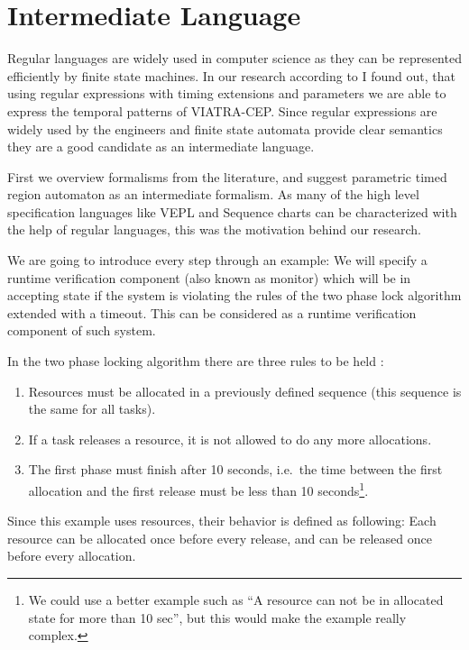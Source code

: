 \chapter{Intermediate Language}
\label{chap:cep}

Regular languages are widely used in computer science as they can be represented efficiently by finite state machines.		
In our research according to \citep{davidi} I found out, that using regular expressions with timing extensions and parameters we are able to express the temporal patterns of VIATRA-CEP.
Since regular expressions are widely used by the engineers and finite state automata provide clear semantics they are a good candidate as an intermediate language.

First we overview formalisms from the literature, and suggest parametric timed region automaton as an intermediate formalism.
As many of the high level specification languages like VEPL and Sequence charts can be characterized with the help of regular languages,
this was the motivation behind our research.%

We are going to introduce every step through an example: 
We will specify a runtime verification component (also known as monitor) which will be in accepting state if the system is violating the rules of the two phase lock algorithm extended with a timeout. 
This can be considered as a runtime verification component of such system.

In the two phase locking algorithm there are three rules to be held :
\begin{enumerate}
	\item Resources must be allocated in a previously defined sequence (this sequence is the same for all tasks).
	\item If a task releases a resource, it is not allowed to do any more allocations.
	\item The first phase must finish after 10 seconds, i.e.~the time between the first allocation and the first release must be less than 10 seconds\footnote{We could use a better example such as ``A resource can not be in allocated state for more than 10 sec'', but this would make the example really complex.}. 
\end{enumerate}

Since this example uses resources, their behavior is defined as following:
Each resource can be allocated once before every release, and can be released once before every allocation.
	
